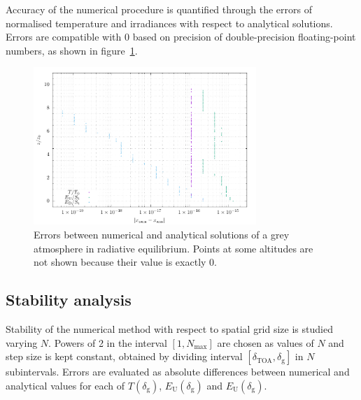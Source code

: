 \documentclass[a4paper,10pt,twocolumn,\classoptions]{article}
\newcommand{\deltaTOA}{\delta_\text{TOA}}
\begin{document}
Accuracy of the numerical procedure is quantified through the errors of normalised temperature and irradiances with respect to analytical solutions. Errors are compatible with 0 based on precision of double-precision floating-point numbers, as shown in figure~\ref{fig:errors}.
\begin{figure}[h]
  \centering
  \includegraphics*[keepaspectratio=true,width=0.75\textwidth]{errors}
  \caption{Errors between numerical and analytical solutions of a grey atmosphere in radiative equilibrium. Points at some altitudes are not shown because their value is exactly 0.}
  \label{fig:errors}
\end{figure}

\subsection{Stability analysis}
Stability of the numerical method with respect to spatial grid size is studied varying $N$. Powers of 2 in the interval $[1, N_\text{max}]$ are chosen as values of $N$ and step size is kept constant, obtained by dividing interval $[\deltaTOA, \delta_\text{g}]$ in $N$ subintervals. Errors are evaluated as absolute differences between numerical and analytical values for each of $T(\delta_\text{g})$, $E_\text{U}(\delta_\text{g})$ and $E_\text{U}(\delta_\text{g})$.
\end{document}
